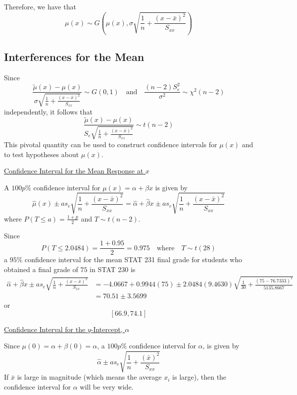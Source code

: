 Therefore, we have that
\[\mu(x) \sim G\left(\mu(x), \sigma \sqrt{\frac{1}{n}+\frac{(x-\bar{x})^{2}}{S_{x x}}}\right)\]
\subsection{Interferences for the Mean}
Since
\[ \frac{\tilde{\mu}(x)-\mu(x)}{\sigma \sqrt{\frac{1}{n}+\frac{\left( x-\bar{x} \right)^2}{S_{xx}}}}\sim G(0,1)
    \quad\text{and}\quad \frac{(n-2)S_e^2}{\sigma^2}\sim \chi^2(n-2)   \]
independently, it follows that
\[ \frac{\tilde{\mu}(x)-\mu(x)}{S_e \sqrt{\frac{1}{n}+\frac{\left( x-\bar{x} \right)^2}{S_{xx}}}}\sim
    t(n-2) \]
This pivotal quantity can be used to construct confidence intervals for $ \mu(x) $
and to test hypotheses about $ \mu(x) $.

\underline{Confidence Interval for the Mean Response at $ x $}

A $ 100p\% $ confidence interval for $ \mu(x)=\alpha+\beta x $ is given by
\[ \hat{\mu}(x)\pm a s_e\sqrt{\frac{1}{n}+\frac{\left( x-\bar{x} \right)^2}{S_{xx}}}=
    \hat{\alpha}+\hat{\beta}x\pm as_e \sqrt{\frac{1}{n}+\frac{\left( x-\bar{x} \right)^2}{S_{xx}}}\]
where $ P(T\leqslant a)=\frac{1+p}{2} $ and $ T \sim t(n-2) $.

\begin{exbox}
    \begin{example}
        Since
        \[ P(T\leqslant 2.0484)=\frac{1+0.95}{2}=0.975\quad\text{where}\quad T\sim t(28) \]
        a $ 95\% $ confidence interval for the mean STAT 231 final grade for students who obtained
        a final grade of $ 75 $ in STAT 230 is
        \begin{align*}
            \hat{\alpha}+\hat{\beta} x \pm a s_{e} \sqrt{\frac{1}{n}+\frac{(x-\bar{x})^{2}}{S_{x x}}}
             & =-4.0667+0.9944(75) \pm 2.0484(9.4630) \sqrt{\frac{1}{30}+\frac{(75-76.7333)^{2}}{5135.8667}} \\
             & =70.51 \pm 3.5699
        \end{align*}
        or
        \[ \left[ 66.9,74.1 \right] \]
    \end{example}
\end{exbox}

\underline{Confidence Interval for the $ y $-Intercept, $ \alpha $}

Since $ \mu(0)=\alpha+\beta(0)=\alpha $, a $ 100p\% $ confidence interval for $ \alpha $,
is given by
\[ \hat{\alpha}\pm as_e\sqrt{\frac{1}{n} +\frac{\left( \bar{x} \right)^2}{S_{xx}} } \]
If $ \bar{x} $ is large in magnitude (which means the average $ x_i $ is large),
then the confidence interval for $ \alpha $ will be very wide.

